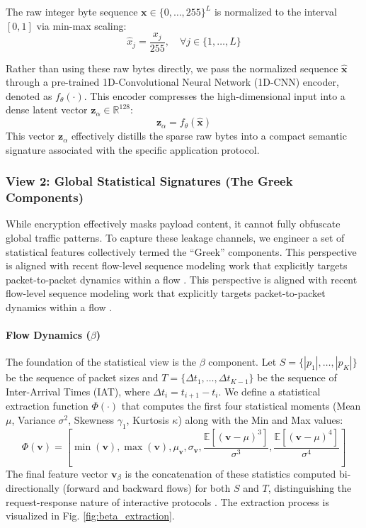 The raw integer byte sequence $\mathbf{x} \in \{0, \dots, 255\}^L$ is normalized to the interval $[0,1]$ via min-max scaling:
\begin{equation}
    \hat{x}_j = \frac{x_j}{255}, \quad \forall j \in \{1, \dots, L\}
\end{equation}

Rather than using these raw bytes directly, we pass the normalized sequence $\hat{\mathbf{x}}$ through a pre-trained 1D-Convolutional Neural Network (1D-CNN) encoder, denoted as $f_{\theta}(\cdot)$. This encoder compresses the high-dimensional input into a dense latent vector $\mathbf{z}_{\alpha} \in \mathbb{R}^{128}$:
\begin{equation}
    \mathbf{z}_{\alpha} = f_{\theta}(\hat{\mathbf{x}})
\end{equation}
This vector $\mathbf{z}_{\alpha}$ effectively distills the sparse raw bytes into a compact semantic signature associated with the specific application protocol.

\subsubsection{View 2: Global Statistical Signatures (The Greek Components)}
\label{subsubsec:greek_view}

While encryption effectively masks payload content, it cannot fully obfuscate global traffic patterns. To capture these leakage channels, we engineer a set of statistical features collectively termed the ``Greek'' components. This perspective is aligned with recent flow-level sequence modeling work that explicitly targets packet-to-packet dynamics within a flow \cite{chen2024miett}. This perspective is aligned with recent flow-level sequence modeling work that explicitly targets packet-to-packet dynamics within a flow \cite{chen2024miett}.

\paragraph{Flow Dynamics ($\beta$)}
The foundation of the statistical view is the $\beta$ component. Let $S = \{|p_1|, \dots, |p_K|\}$ be the sequence of packet sizes and $T = \{\Delta t_1, \dots, \Delta t_{K-1}\}$ be the sequence of Inter-Arrival Times (IAT), where $\Delta t_i = t_{i+1} - t_i$. We define a statistical extraction function $\Phi(\cdot)$ that computes the first four statistical moments (Mean $\mu$, Variance $\sigma^2$, Skewness $\gamma_1$, Kurtosis $\kappa$) along with the Min and Max values:
\begin{equation}
    \Phi(\mathbf{v}) = \left[ \min(\mathbf{v}), \max(\mathbf{v}), \mu_{\mathbf{v}}, \sigma_{\mathbf{v}}, \frac{\mathbb{E}[(\mathbf{v}-\mu)^3]}{\sigma^3}, \frac{\mathbb{E}[(\mathbf{v}-\mu)^4]}{\sigma^4} \right]
\end{equation}
The final feature vector $\mathbf{v}_{\beta}$ is the concatenation of these statistics computed bi-directionally (forward and backward flows) for both $S$ and $T$, distinguishing the request-response nature of interactive protocols \cite{draper2016characterization}. The extraction process is visualized in Fig. \ref{fig:beta_extraction}.

